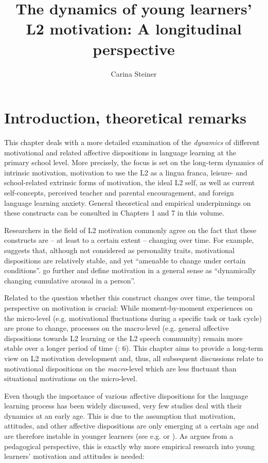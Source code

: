 \documentclass[output=paper]{langsci/langscibook}
\author{Carina Steiner\orcid{}\affiliation{University of Berne, Center for the Study of Language and Society}}
\title{The dynamics of young learners’ L2 motivation: A longitudinal perspective}
\begin{document}
\maketitle 

\section{Introduction, theoretical remarks}

This chapter deals with a more detailed examination of the \textit{dynamics} of different motivational and related affective dispositions in language learning at the primary school level. More precisely, the focus is set on the long-term dynamics of intrinsic motivation, motivation to use the L2 as a lingua franca, leisure- and school-related extrinsic forms of motivation, the ideal L2 self, as well as current self-concepts, perceived teacher and parental encouragement, and foreign language learning anxiety. General theoretical and empirical underpinnings on these constructs can be consulted in Chapters 1 and 7 in this volume.

Researchers in the field of L2 motivation commonly agree on the fact that these constructs are – at least to a certain extent – changing over time. For example, \citet[11]{Gardner2007} suggests that, although not considered as personality traits, motivational dispositions are relatively stable, and yet “amenable to change under certain conditions”. \citet[65]{DoernyeiOtto1998} go further and define motivation in a general sense as “dynamically changing cumulative arousal in a person”. 

Related to the question whether this construct changes over time, the temporal perspective on motivation is crucial: While moment-by-moment experiences on the micro-level (e.g. motivational fluctuations during a specific task or task cycle) are prone to change, processes on the macro-level (e.g. general affective dispositions towards L2 learning or the L2 speech community) remain more stable over a longer period of time (\citealt{DoernyeiUshioda2011}: 6). This chapter aims to provide a long-term view on L2 motivation development and, thus, all subsequent discussions relate to motivational dispositions on the \textit{macro}{}-level which are less fluctuant than situational motivations on the micro-level. 

Even though the importance of various affective dispositions for the language learning process has been widely discussed, very few studies deal with their dynamics at an early age. This is due to the assumption that motivation, attitudes, and other affective dispositions are only emerging at a certain age and are therefore instable in younger learners (see e.g. \citealt{Gardner2006} or \citealt{Doernyei2009}). As \citet{Heinzmann2013} argues from a pedagogical perspective, this is exactly why more empirical research into young learners’ motivation and attitudes is needed:
\end{document}
